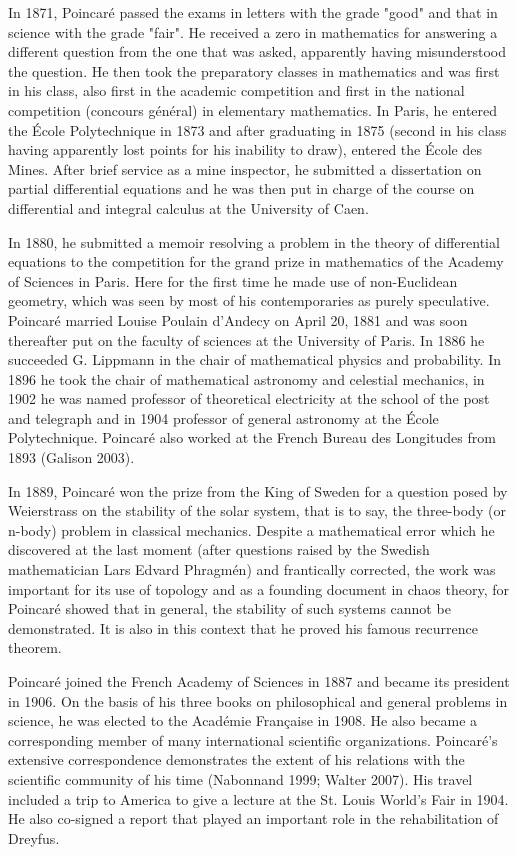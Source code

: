 In 1871, Poincar\'{e} passed the exams in letters with the grade "good" and that in science with the grade "fair". He received a zero in mathematics for answering a different question from the one that was asked, apparently having misunderstood the question. He then took the preparatory classes in mathematics and was first in his class, also first in the academic competition and first in the national competition (concours g\'{e}n\'{e}ral) in elementary mathematics. In Paris, he entered the École Polytechnique in 1873 and after graduating in 1875 (second in his class having apparently lost points for his inability to draw), entered the \'{E}cole des Mines. After brief service as a mine inspector, he submitted a dissertation on partial differential equations and he was then put in charge of the course on differential and integral calculus at the University of Caen.

In 1880, he submitted a memoir resolving a problem in the theory of differential equations to the competition for the grand prize in mathematics of the Academy of Sciences in Paris. Here for the first time he made use of non-Euclidean geometry, which was seen by most of his contemporaries as purely speculative. Poincar\'{e} married Louise Poulain d'Andecy on April 20, 1881 and was soon thereafter put on the faculty of sciences at the University of Paris. In 1886 he succeeded G. Lippmann in the chair of mathematical physics and probability. In 1896 he took the chair of mathematical astronomy and celestial mechanics, in 1902 he was named professor of theoretical electricity at the school of the post and telegraph and in 1904 professor of general astronomy at the \'{E}cole Polytechnique. Poincar\'{e} also worked at the French Bureau des Longitudes from 1893 (Galison 2003).

In 1889, Poincar\'{e} won the prize from the King of Sweden for a question posed by Weierstrass on the stability of the solar system, that is to say, the three-body (or n-body) problem in classical mechanics. Despite a mathematical error which he discovered at the last moment (after questions raised by the Swedish mathematician Lars Edvard Phragm\'{e}n) and frantically corrected, the work was important for its use of topology and as a founding document in chaos theory, for Poincar\'{e} showed that in general, the stability of such systems cannot be demonstrated. It is also in this context that he proved his famous recurrence theorem.

Poincar\'{e} joined the French Academy of Sciences in 1887 and became its president in 1906. On the basis of his three books on philosophical and general problems in science, he was elected to the Académie Française in 1908. He also became a corresponding member of many international scientific organizations. Poincar\'{e}'s extensive correspondence demonstrates the extent of his relations with the scientific community of his time (Nabonnand 1999; Walter 2007). His travel included a trip to America to give a lecture at the St. Louis World's Fair in 1904. He also co-signed a report that played an important role in the rehabilitation of Dreyfus.


